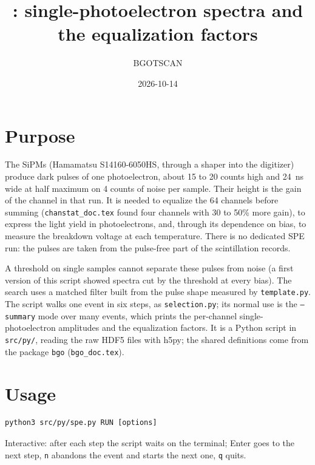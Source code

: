 \documentclass[11pt]{article}
\title{\code{spe.py}: single-photoelectron spectra and the equalization factors}
\author{BGOTSCAN}
\date{2026-10-14}
\newcommand{\code}[1]{\texttt{#1}}
\begin{document}
\maketitle

\section{Purpose}

The SiPMs (Hamamatsu S14160-6050HS, through a shaper into the digitizer)
produce dark pulses of one photoelectron, about 15 to 20 counts high and
24~ns wide at half maximum on 4 counts of noise per sample. Their height
is the gain of the channel in that run. It is needed to equalize the 64
channels before summing (\code{chanstat\_doc.tex} found four channels with
30 to 50\% more gain), to express the light yield in photoelectrons, and,
through its dependence on bias, to measure the breakdown voltage at each
temperature. There is no dedicated SPE run: the pulses are taken from the
pulse-free part of the scintillation records.

A threshold on single samples cannot separate these pulses from noise (a
first version of this script showed spectra cut by the threshold at every
bias). The search uses a matched filter built from the pulse shape
measured by \code{template.py}. The script walks one event in six steps,
as \code{selection.py}; its normal use is the \code{--summary} mode over
many events, which prints the per-channel single-photoelectron amplitudes
and the equalization factors. It is a Python script in \code{src/py/},
reading the raw HDF5 files with h5py; the shared definitions come from the
package \code{bgo} (\code{bgo\_doc.tex}).

\section{Usage}

\begin{lstlisting}
python3 src/py/spe.py RUN [options]
\end{lstlisting}

Interactive: after each step the script waits on the terminal; Enter goes
to the next step, \code{n} abandons the event and starts the next one,
\code{q} quits.
\end{document}
